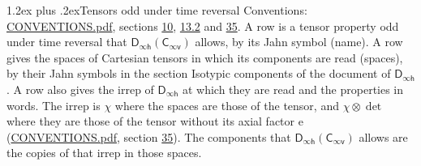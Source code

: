 \documentclass[10pt,a4paper]{article}
\makeatletter
\renewcommand\section{\@startsection{section}{1}{\z@}{-3ex plus -1ex minus -.2ex}%
  {1.2ex plus .2ex}{\normalfont\large\sffamily\bfseries\color{parttitle}}}
\numberwithin{equation}{section}
\newcommand{\grp}[1]{\mathsf{#1}}
\newcommand{\irrprod}{\otimes}
\makeatother
\begin{document}
\section{Tensors odd under time reversal}\label{s:time_odd}
Conventions: \href{../../CONVENTIONS.pdf}{CONVENTIONS.pdf}, sections \href{../../../rotation/CONVENTIONS.pdf\#conv.10}{10}, \href{../../../rotation/CONVENTIONS.pdf\#conv.13.2}{13.2} and \href{../../CONVENTIONS.pdf\#conv.35}{35}.
\leavevmode\label{n:head.name.property}A row is a tensor property odd under time reversal that $\grp{D_{\infty h}}(\grp{C_{\infty v}})$ allows, by its Jahn symbol (name). \label{n:head.spaces}A row gives the spaces of Cartesian tensors in which its components are read (spaces), by their Jahn symbols in the section Isotypic components of the document of \href{../../../rotation/data/pdf/Dinfh.pdf}{$\grp{D_{\infty h}}$}. \label{n:head.irrep}\label{n:head.properties}A row also gives the irrep of $\grp{D_{\infty h}}$ at which they are read and the properties in words. The irrep is $\chi$ where the spaces are those of the tensor, and $\chi \irrprod \det$ where they are those of the tensor without its axial factor e (\href{../../CONVENTIONS.pdf}{CONVENTIONS.pdf}, section \href{../../CONVENTIONS.pdf\#conv.35}{35}). The components that $\grp{D_{\infty h}}(\grp{C_{\infty v}})$ allows are the copies of that irrep in those spaces.
\end{document}

